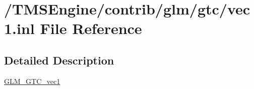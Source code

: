 \hypertarget{gtc_2vec1_8inl}{}\section{/\+T\+M\+S\+Engine/contrib/glm/gtc/vec1.inl File Reference}
\label{gtc_2vec1_8inl}


\subsection{Detailed Description}
\hyperlink{group__gtc__vec1}{G\+L\+M\+\_\+\+G\+T\+C\+\_\+vec1} 